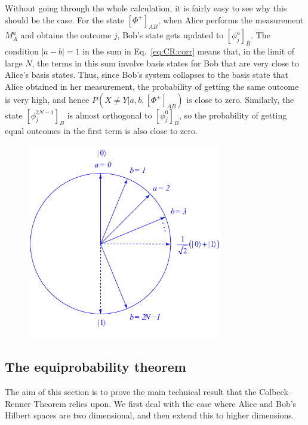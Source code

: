 \documentclass[DIV=calc,fontsize=12pt]{scrartcl} %
\theoremstyle{definition}
\theoremstyle{plain}
\newcommand{\Proj}[1]{\ensuremath{\left [ #1 \right ]}}
\begin{document}
Without going through the whole calculation, it is fairly easy to see
why this should be the case.  For the state $\Proj{\Phi^+}_{AB}$, when
Alice performs the measurement $M_A^a$ and obtains the outcome $j$,
Bob's state gets updated to $\Proj{\phi^a_j}_B$.  The condition $|a-b|
= 1$ in the sum in Eq.~\eqref{eq:CR:corr} means that, in the limit of
large $N$, the terms in this sum involve basis states for Bob that are
very close to Alice's basis states.  Thus, since Bob's system
collapses to the basis state that Alice obtained in her measurement,
the probability of getting the same outcome is very high, and hence
$P(X \neq Y|a,b,\Proj{\Phi^+}_{AB})$ is close to zero.  Similarly, the
state $\Proj{\phi_j^{2N-1}}_B$ is almost orthogonal to
$\Proj{\phi_j^{0}}_B$, so the probability of getting equal outcomes in
the first term is also close to zero.
\begin{figure}[t!]
\centering
\includegraphics[width=85mm]{Fig15.pdf}
\caption{}
\end{figure}

\subsection{The equiprobability theorem}

\label{CR:Equi}

The aim of this section is to prove the main technical result that the
Colbeck--Renner Theorem relies upon.  We first deal with the case where
Alice and Bob's Hilbert spaces are two dimensional, and then extend
this to higher dimensions.
\end{document}
